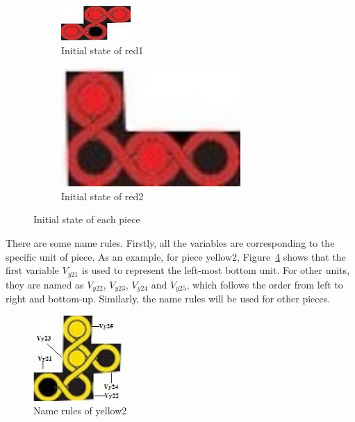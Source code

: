 \begin{figure}[htbp]
\begin{subfigure}[b]{.24\textwidth}
\centering
\includegraphics[width =\textwidth]{figs/red1.jpg}
\caption{Initial state of red1}
  \label{fig:2Dred1}
\end{subfigure}
\begin{subfigure}[b]{.24\textwidth}
\centering
\includegraphics[width=0.75\textwidth]{figs/red2.jpg}
\caption{Initial state of red2}
  \label{fig:2Dred2}
\end{subfigure}
\caption{Initial state of each piece}
  \label{fig:allinit}
\end{figure}
There are some name rules. Firstly, all the variables are corresponding to the specific unit of piece. As an example, for piece yellow2, Figure~\ref{fig:namerules} shows that the first variable $V_{y21}$ is used to represent the left-most bottom unit. For other units, they are named as $V_{y22}$, $V_{y23}$, $V_{y24}$ and $V_{y25}$, which follows the order from left to right and bottom-up. Similarly, the name rules will be used for other pieces. 
\begin{figure}[htbp]
    \centering
    \includegraphics[width=0.3\textwidth]{figs/example.jpg}
    \caption{Name rules of yellow2}
    \label{fig:namerules}
\end{figure}
